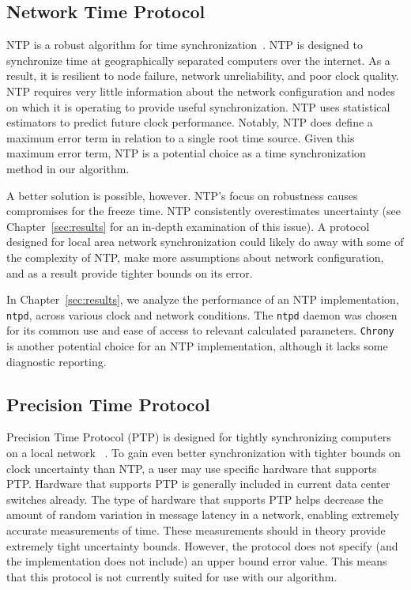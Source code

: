 \subsection{Network Time Protocol}

NTP is a robust algorithm for time
synchronization~\citep{Burbank2010}. NTP is designed to
synchronize time at geographically separated computers over the internet. As a
result, it is resilient to node failure, network unreliability, and
poor clock quality. NTP requires very little information about the
network configuration and nodes on which it is operating to provide useful
synchronization. NTP uses statistical estimators to predict
future clock performance. Notably, NTP does define a maximum error
term in relation to a single root time source. Given this maximum error 
term, NTP is a potential choice as a time synchronization method in 
our algorithm.

A better solution is possible, however. NTP's focus on robustness
causes compromises for the freeze time. NTP consistently overestimates
uncertainty (see Chapter~\ref{sec:results} for an in-depth 
examination of this issue). A protocol designed for local area network
synchronization could likely do away with some of the complexity of
NTP, make more assumptions about network configuration, and as a
result provide tighter bounds on its error.

In Chapter~\ref{sec:results}, we analyze the
performance of an NTP implementation, \texttt{ntpd}, across various clock and
network conditions. The \texttt{ntpd} daemon was chosen for its common use and
ease of access to relevant calculated parameters. \texttt{Chrony} is another
potential choice for an NTP implementation, although it lacks some
diagnostic reporting. %

\subsection{Precision Time Protocol}

Precision Time Protocol (PTP) is designed for 
tightly synchronizing computers on a local network
~\citeyearpar{2008}. To gain even better 
synchronization with tighter bounds on clock uncertainty than NTP, 
a user may use specific hardware that supports PTP. Hardware that supports
PTP is generally included in current data center switches already. The type
of hardware that supports PTP helps decrease the amount of random variation in
message latency in a network, enabling extremely accurate measurements of time.
These measurements should in theory provide extremely tight uncertainty
bounds. However, the protocol does not specify (and the implementation
does not include) an upper bound error value. This means that this
protocol is not currently suited for use with our algorithm.

